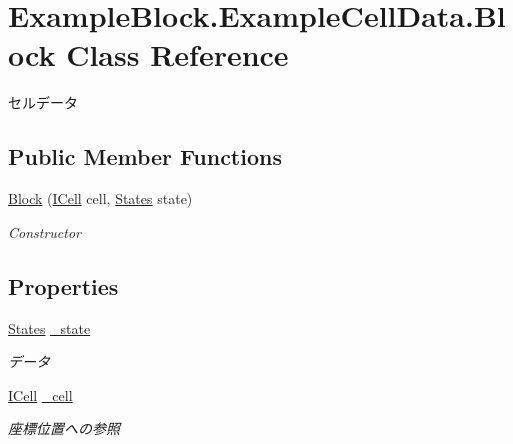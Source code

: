 \hypertarget{class_example_block_1_1_example_cell_data_1_1_block}{}\section{Example\+Block.\+Example\+Cell\+Data.\+Block Class Reference}
\label{class_example_block_1_1_example_cell_data_1_1_block}


セルデータ  


\subsection*{Public Member Functions}
\begin{DoxyCompactItemize}
\item 
\mbox{\hyperlink{class_example_block_1_1_example_cell_data_1_1_block_a2af725f549c3060714393910f488ef31}{Block}} (\mbox{\hyperlink{interface_hexagonal_map_1_1_domain_1_1_hex_map_1_1_i_cell}{I\+Cell}} cell, \mbox{\hyperlink{namespace_example_block_1_1_example_cell_data_a6921c403602d917464ccf88b5ac8b2bc}{States}} state)
\begin{DoxyCompactList}\small\item\em Constructor \end{DoxyCompactList}\end{DoxyCompactItemize}
\subsection*{Properties}
\begin{DoxyCompactItemize}
\item 
\mbox{\hyperlink{namespace_example_block_1_1_example_cell_data_a6921c403602d917464ccf88b5ac8b2bc}{States}} \mbox{\hyperlink{class_example_block_1_1_example_cell_data_1_1_block_a6818333cb2347c286e82ecfa3ea1e8b2}{\+\_\+state}}
\begin{DoxyCompactList}\small\item\em データ \end{DoxyCompactList}\item 
\mbox{\hyperlink{interface_hexagonal_map_1_1_domain_1_1_hex_map_1_1_i_cell}{I\+Cell}} \mbox{\hyperlink{class_example_block_1_1_example_cell_data_1_1_block_a81d18af5f48f43065934144bfb18f3c3}{\+\_\+cell}}
\begin{DoxyCompactList}\small\item\em 座標位置への参照 \end{DoxyCompactList}\end{DoxyCompactItemize}



